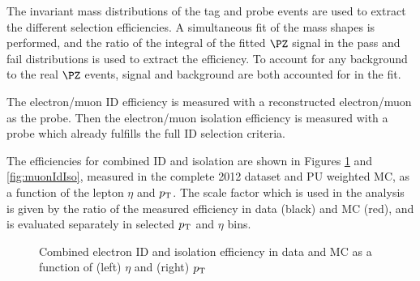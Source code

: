 The invariant mass distributions of the tag and probe events are used to extract
the different
selection efficiencies. A simultaneous fit of the mass shapes is performed, and
the ratio of the integral of the fitted $\PZ$ signal in the pass and fail
distributions is used to extract the efficiency. To account for any background
to the real $\PZ$ events, signal and background are both accounted for in the
fit.

The electron/muon ID efficiency is measured with a reconstructed
electron/muon as the probe. Then the electron/muon isolation efficiency is measured
with a probe which already fulfills the full ID selection criteria. 

The efficiencies for combined ID and isolation are shown in Figures
\ref{fig:electronIdIso} and \ref{fig:muonIdIso}, measured in the complete 2012
dataset and PU weighted MC, as a function of the lepton $\eta$ and $p_{\mathrm{T}}$.
The scale factor which is used in the analysis is given by the ratio of the
measured efficiency in data (black) and MC (red), and is evaluated separately in
selected $p_{\mathrm{T}}$ and $\eta$ bins.

\begin{figure}[h!]
\caption{Combined electron ID and isolation efficiency in data and MC as a
function of (left) $\eta$ and (right) $p_{\mathrm{T}}$}
\label{fig:electronIdIso}
\end{figure}

